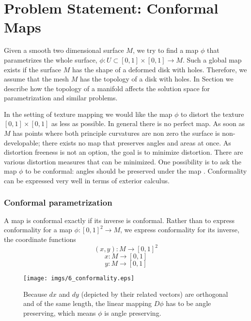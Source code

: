 	\section{Problem Statement: Conformal Maps}
	Given a smooth two dimensional surface $M$, we try to find a map $\phi$ that parametrizes the whole surface, $\phi: U \subset [0,1]\times [0,1] \rightarrow M$. Such a global map exists if the surface $M$ has the shape of a deformed disk with holes. Therefore, we assume that the mesh $M$ has the topology of a disk with holes. In Section  we describe how the topology of a manifold affects the solution space for parametrization and similar problems.
	
In the setting of texture mapping we would like the map $\phi$ to distort the texture $[0,1]\times [0,1]$ as less as possible. In general there is no perfect map. As soon as $M$ has points where both principle curvatures are non zero the surface is non-developable; there exists no map that preserves angles and areas at once\note{[...]}. As distortion freeness is not an option, the goal is to minimize distortion. There are various distortion measures that can be minimized. One possibility is to ask the map $\phi$ to be conformal: angles should be preserved under the map . 
Conformality can be expressed very well in terms of exterior calculus. 

\subsubsection{Conformal parametrization}
A map is conformal exactly if its inverse is conformal. Rather than to express conformality for a map $\phi:[0,1]^2\rightarrow M$, we express conformality for its inverse, the coordinate functions
\[(x,y): M \rightarrow [0,1]^2\]
\[x:M \rightarrow [0,1]\]
\[y:M \rightarrow [0,1]\]

\begin{figure}%
\begin{center}
\texttt{[image: imgs/6\_conformality.eps]}%
\end{center}
\caption{Because $dx$ and $dy$ (depicted by their related vectors) are orthogonal and of the same length, the linear mapping $D\phi$ has to be angle preserving, which means $\phi$ is angle preserving.}%
\label{fig:6_conformality}%
\end{figure}

